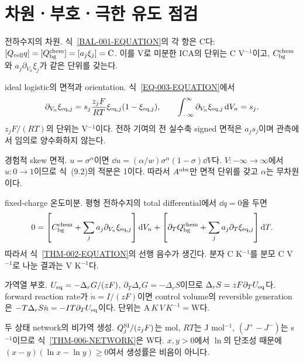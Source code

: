 \section{차원ㆍ부호ㆍ극한 유도 점검}\label{ASM-CHECKS}

\begin{derivationcheck}
 전하수지의 차원.
식~\eqref{BAL-001-EQUATION}의 각 항은 C다:
$[Q_{\mathrm{cell}} q]=[Q_{\mathrm{bg}}^{\mathrm{chem}}]=[a_j\xi_j]=\mathrm C$.
이를 V로 미분한 ICA의 단위는 C V$^{-1}$이고,
$C_{\mathrm{bg}}^{\mathrm{chem}}$와 $a_j\partial_{V_n}\xi_j$가 같은 단위를 갖는다.
\end{derivationcheck}

\begin{derivationcheck}
 ideal logistic의 면적과 orientation.
식~\eqref{EQ-003-EQUATION}에서
\[
\partial_{V_n}\xi_{\mathrm{eq},j}
=s_j\frac{z_jF}{RT}\xi_{\mathrm{eq},j}(1-\xi_{\mathrm{eq},j}),
\qquad
\int_{-\infty}^{\infty}\partial_{V_n}\xi_{\mathrm{eq},j}\,\mathrm d V_n=s_j .
\]
$z_jF/(RT)$의 단위는 V$^{-1}$이다. 전하 기여의 전 실수축
signed 면적은 $a_js_j$이며 관측에서 임의로 양수화하지 않는다.
\end{derivationcheck}

\begin{derivationcheck}
 경험적 skew 면적.
$u=\sigma^\alpha$이면
$\dd u=(\alpha/w)\sigma^\alpha(1-\sigma)\dd V$다.
$V:-\infty\to\infty$에서 $u:0\to1$이므로 식~(9.2)의 적분은 1이다.
따라서 $A^{\mathrm{obs}}$만 면적 단위를 갖고 $\alpha$는 무차원이다.
\end{derivationcheck}

\begin{derivationcheck}
 fixed-charge 온도미분.
평형 전하수지의 total differential에서 $\dd q=0$을 두면
\[
0=\left[
C_{\mathrm{bg}}^{\mathrm{chem}}+\sum_j a_j\partial_{V_n}\xi_{\mathrm{eq},j}
\right]\mathrm d V_n
+\left[
\partial_TQ_{\mathrm{bg}}^{\mathrm{chem}}+\sum_j a_j\partial_T\xi_{\mathrm{eq},j}
\right]\mathrm d T .
\]
따라서 식~\eqref{THM-002-EQUATION}의 선행 음수가 생긴다.
분자 C K$^{-1}$를 분모 C V$^{-1}$로 나눈 결과는 V K$^{-1}$다.
\end{derivationcheck}

\begin{derivationcheck}
 가역열 부호.
$U_{\mathrm{eq}}=-\Delta_rG/(zF)$,
$\partial_T\Delta_rG=-\Delta_rS$이므로
$\Delta_rS=zF\partial_TU_{\mathrm{eq}}$다. forward reaction rate가
$\dot n=I/(zF)$이면 control volume의 reversible generation은
$-T\Delta_rS\dot n=-IT\partial_TU_{\mathrm{eq}}$이다. 단위는
$\mathrm A\,K\,V\,K^{-1}=\mathrm W$다.
\end{derivationcheck}

\begin{derivationcheck}
 두 상태 network의 비가역 생성.
$Q_j^{\rm SI}/(z_jF)$는 mol,
$RT$는 J mol$^{-1}$, $(J^+-J^-)$는 s$^{-1}$이므로
식~\eqref{THM-006-NETWORK}은 W다.
$x,y>0$에서 $\ln$의 단조성 때문에
$(x-y)(\ln x-\ln y)\ge0$여서 생성률은 비음이 아니다.
\end{derivationcheck}


